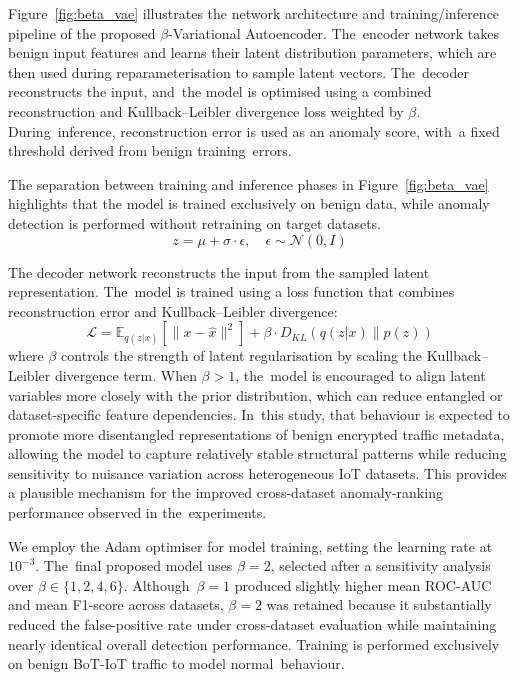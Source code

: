 \documentclass[futureinternet,article,accept,moreauthors]{Definitions/mdpi}
\begin{document}
Figure~\ref{fig:beta_vae} illustrates the network architecture and training/inference pipeline of the proposed $\beta$-Variational Autoencoder. The~encoder network takes benign input features and learns their latent distribution parameters, which are then used during reparameterisation to sample latent vectors. The~decoder reconstructs the input, and~the model is optimised using a combined reconstruction and Kullback--Leibler divergence loss weighted by $\beta$. During~inference, reconstruction error is used as an anomaly score, with~a fixed threshold derived from benign training~errors.

The separation between training and inference phases in Figure~\ref{fig:beta_vae} highlights that the model is trained exclusively on benign data, while anomaly detection is performed without retraining on target datasets.
\begin{equation}
z = \mu + \sigma \cdot \epsilon, \quad \epsilon \sim \mathcal{N}(0, I)
\end{equation}

The decoder network reconstructs the input from the sampled latent representation. The~model is trained using a loss function that combines reconstruction error and Kullback--Leibler divergence:
\begin{equation}
\mathcal{L} = \mathbb{E}_{q(z|x)}[\|x - \hat{x}\|^2] + \beta \cdot D_{KL}(q(z|x) \| p(z))
\end{equation}
where $\beta$ controls the strength of latent regularisation by scaling the Kullback--Leibler divergence term. When $\beta > 1$, the~model is encouraged to align latent variables more closely with the prior distribution, which can reduce entangled or dataset-specific feature dependencies. In~this study, that behaviour is expected to promote more disentangled representations of benign encrypted traffic metadata, allowing the model to capture relatively stable structural patterns while reducing sensitivity to nuisance variation across heterogeneous IoT datasets. This provides a plausible mechanism for the improved cross-dataset anomaly-ranking performance observed in the~experiments.

We employ the Adam optimiser for model training, setting the learning rate at $10^{-3}$. The~final proposed model uses $\beta = 2$, selected after a sensitivity analysis over $\beta \in \{1,2,4,6\}$. Although~$\beta = 1$ produced slightly higher mean ROC-AUC and mean F1-score across datasets, $\beta = 2$ was retained because it substantially reduced the false-positive rate under cross-dataset evaluation while maintaining nearly identical overall detection performance. Training is performed exclusively on benign BoT-IoT traffic to model normal~behaviour.
\end{document}
